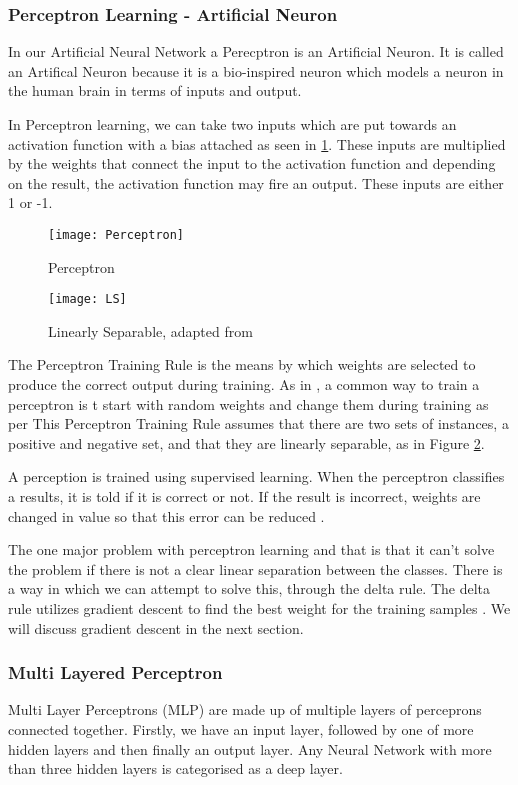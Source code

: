 \subsubsection*{Perceptron Learning - Artificial Neuron}
In our Artificial Neural Network a Perecptron is an Artificial Neuron.
It is called an Artifical Neuron because it is a bio-inspired neuron which models
a neuron in the human brain in terms of inputs and output.

In Perceptron learning, we can take two inputs which are put towards an
activation function with a bias attached as seen in \ref{fig:perceptron}.
These inputs are multiplied by the weights that connect the input to the
activation function and depending on the result, the activation function may
fire an output. These inputs are either 1 or -1.

\begin{figure}
     \texttt{[image: Perceptron]}
     \caption{Perceptron}
     \label{fig:perceptron}
\end{figure}

\begin{figure}
    \texttt{[image: LS]}
     \caption{Linearly Separable, adapted from \textcite{MLANN}}
     \label{fig:ls}
\end{figure}

The Perceptron Training Rule is the means by which weights are selected to produce the correct output during training. As in \textcite{MLANN}, a common way to train a perceptron is t start with random weights and change them during training as per
This Perceptron Training Rule assumes that there are two sets of instances, a
positive and negative set, and that they are linearly separable, as in Figure \ref{fig:ls}.

A perception is trained using supervised learning. When the perceptron
classifies a results, it is told if it is correct or not. If the result is
incorrect, weights are changed in value so that this error can be reduced
\textcite{AI}. 

The one major problem with perceptron learning and that is that it can't solve
the problem if there is not a clear linear separation between the classes. There
is a way in which we can attempt to solve this, through the delta rule. The
delta rule utilizes gradient descent to find the best weight for the training
samples \textcite{MLANN}. We will discuss gradient descent in the next section.

\subsubsection*{Multi Layered Perceptron}
Multi Layer Perceptrons (MLP) are made up of multiple layers of perceprons connected
together.
Firstly, we have an input layer, followed by one of more hidden layers and then
finally an output layer.
Any Neural Network with more than three hidden layers is categorised as a deep
layer.

